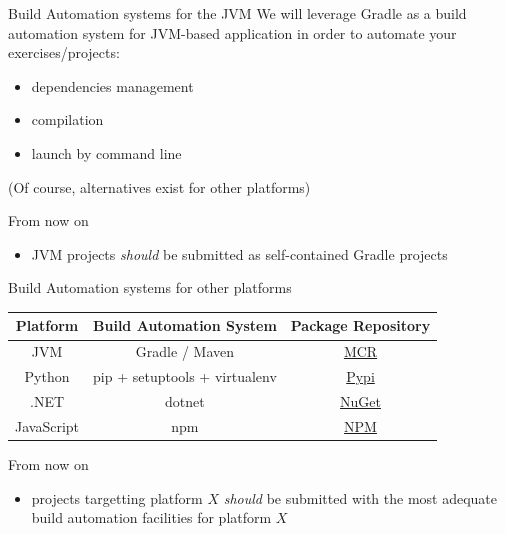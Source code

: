 \documentclass[presentation]{beamer}\mode<presentation>{\usetheme{AMSBolognaFC}}
\begin{document}
\begin{frame}{Build Automation systems for the JVM}
    We will leverage \alert{Gradle} as a build automation system for JVM-based application in order to automate your exercises/projects:
    \begin{itemize}
        \item dependencies management
        \item compilation
        \item launch by command line
    \end{itemize}

    \vfill

    (Of course, alternatives exist for other platforms)

    \vfill

    \begin{block}{From now on}
        \begin{itemize}
            \item JVM projects \emph{should} be submitted as self-contained Gradle projects
        \end{itemize}
    \end{block}
\end{frame}

\begin{frame}{Build Automation systems for other platforms}

    \begin{table}[H!]
        \centering
        \begin{tabular}{c|c|c}
            \textbf{Platform} & \textbf{Build Automation System} & \textbf{Package Repository}
            \\\hline\hline
            JVM               & Gradle / Maven                   & \href{https://search.maven.org/}{MCR}
            \\
            Python            & pip + setuptools + virtualenv\footnotemark    & \href{https://pypi.org/}{Pypi}
            \\
            .NET              & dotnet                           & \href{https://www.nuget.org/}{NuGet}
            \\
            JavaScript        & npm                              & \href{https://www.npmjs.com/}{NPM}
        \end{tabular}
    \end{table}


    \vfill

    \begin{block}{From now on}
        \begin{itemize}
            \item projects targetting platform $X$ \emph{should} be submitted with the most adequate build automation facilities for platform $X$
        \end{itemize}
    \end{block}
\end{frame}
\end{document}
